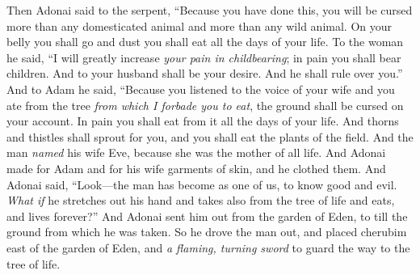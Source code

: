 \begin{biblechapter}
\verse Then Adonai said to the serpent,
\verse “Because you have done this, 
you will be cursed 
more than any domesticated animal 
and more than any wild animal. 
On your belly you shall go 
and dust you shall eat 
all the days of your life.
\verse To the woman he said, “I will greatly increase 
\textit{your pain in childbearing}; 
in pain you shall bear children. 
And to your husband shall be your desire. 
And he shall rule over you.”
\verse And to Adam he said, “Because you listened to the voice of your wife and you ate from the tree \textit{from which I forbade you to eat},
\verse the ground shall be cursed on your account. 
In pain you shall eat from it 
all the days of your life.
\verse And thorns and thistles shall sprout for you, 
and you shall eat the plants of the field.
\verse And the man \textit{named} his wife Eve, because she was the mother of all life.
\verse And Adonai made for Adam and for his wife garments of skin, and he clothed them.
\verse And Adonai said, “Look—the man has become as one of us, to know good and evil. \textit{What if} he stretches out his hand and takes also from the tree of life and eats, and lives forever?”
\verse And Adonai sent him out from the garden of Eden, to till the ground from which he was taken.
\verse So he drove the man out, and placed cherubim east of the garden of Eden, and \textit{a flaming, turning sword} to guard the way to the tree of life.
\end{biblechapter}

